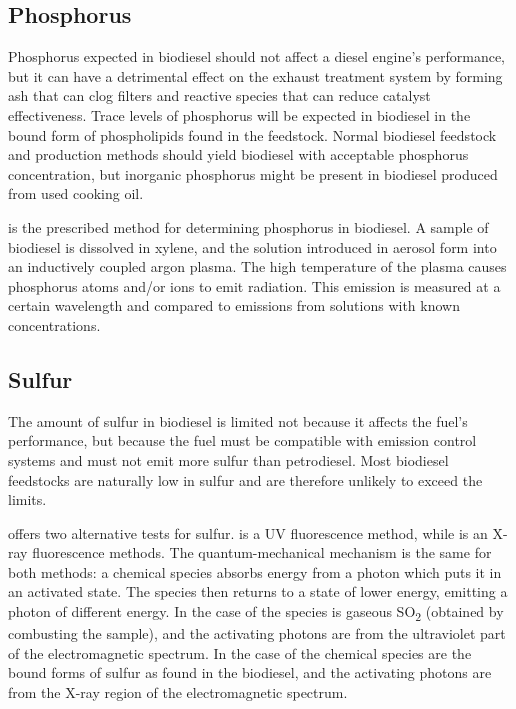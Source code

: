 \subsection{Phosphorus}

Phosphorus expected in biodiesel should not affect a diesel engine's
performance, but it can have a detrimental effect on the exhaust treatment
system by forming ash that can clog filters and reactive species that can reduce
catalyst effectiveness. Trace levels of phosphorus will be expected in biodiesel
in the bound form of phospholipids found in the feedstock. Normal biodiesel
feedstock and production methods should yield biodiesel with acceptable
phosphorus concentration, but inorganic phosphorus might be present in biodiesel
produced from used cooking oil.
 
 is the prescribed method for determining phosphorus in
biodiesel. A sample of biodiesel is dissolved in xylene, and the solution
introduced in aerosol form into an inductively coupled argon plasma. The high
temperature of the plasma causes phosphorus atoms and/or ions to emit radiation.
This emission is measured at a certain wavelength and compared to emissions from
solutions with known concentrations.

\subsection{Sulfur}

The amount of sulfur in biodiesel is limited not because it affects the fuel's
performance, but because the fuel must be compatible with emission control
systems and must not emit more sulfur than petrodiesel. Most biodiesel
feedstocks are naturally low in sulfur and are therefore unlikely to exceed the
limits.

 offers two alternative tests for sulfur.  is a UV
fluorescence method, while  is an X-ray fluorescence methods. The
quantum-mechanical mechanism is the same for both methods: a chemical species
absorbs energy from a photon which puts it in an activated state. The species
then returns to a state of lower energy, emitting a photon of different energy.
In the case of  the species is gaseous SO\textsubscript{2}
(obtained by combusting the sample), and the activating photons are from the
ultraviolet part of the electromagnetic spectrum. In the case of 
the chemical species are the bound forms of sulfur as found in the biodiesel,
and the activating photons are from the X-ray region of the electromagnetic
spectrum.

